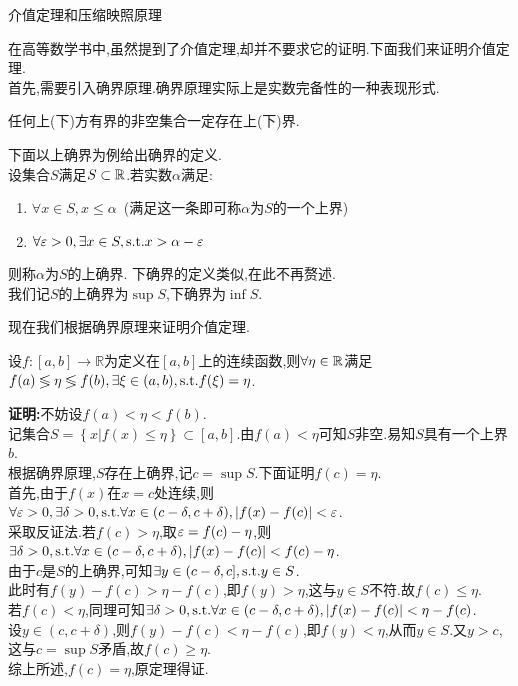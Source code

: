 \documentclass{ctexart}
\begin{document}
\pagestyle{empty}
\begin{center}\large 介值定理和压缩映照原理\end{center}
在高等数学书中,虽然提到了介值定理,却并不要求它的证明.下面我们来证明介值定理.\\
首先,需要引入确界原理.确界原理实际上是实数完备性的一种表现形式.
\begin{formal}[确界原理]
    任何上(下)方有界的非空集合一定存在上(下)界.
\end{formal}
\begin{theorem}
    下面以上确界为例给出确界的定义.\\
    设集合$S$满足$S\subset \mathbb{R}$.若实数$\alpha$满足:
    \begin{enumerate}[label=(\alph*)]
        \item $\forall x\in S,x\leqslant\alpha$\ (满足这一条即可称$\alpha$为$S$的一个上界)
        \item $\forall\varepsilon>0,\exists x\in S,\text{s.t.} x>\alpha-\varepsilon$
    \end{enumerate}
    则称$\alpha$为$S$的上确界.
    下确界的定义类似,在此不再赘述.\\
    我们记$S$的上确界为$\sup{S}$,下确界为$\inf{S}$.
\end{theorem}\noindent
现在我们根据确界原理来证明介值定理.
\begin{formal}[介值定理]
    设$f:[a,b]\to\mathbb{R}$为定义在$[a,b]$上的连续函数,则$\forall\eta\in\mathbb{R}$满足$f(a)\lessgtr\eta\lessgtr f(b),\exists\xi\in(a,b),\text{s.t.} f(\xi)=\eta$.
\end{formal}
\begin{solution}
    \textbf{证明:}不妨设$f(a)<\eta<f(b)$.\\
    记集合$S=\left\{x|f(x)\leqslant \eta\right\}\subset[a,b].$由$f(a)<\eta$可知$S$非空.易知$S$具有一个上界$b$.\\
    根据确界原理,$S$存在上确界,记$c=\sup{S}$.下面证明$f(c)=\eta$.\\
    首先,由于$f(x)$在$x=c$处连续,则$\forall\varepsilon>0,\exists\delta>0,\text{s.t.}\forall x\in(c-\delta,c+\delta),\left\lvert f(x)-f(c)\right\rvert<\varepsilon$.\\
    采取反证法.若$f(c)>\eta$,取$\varepsilon=f(c)-\eta$,则$\exists\delta>0,\text{s.t.}\forall x\in(c-\delta,c+\delta),\left\lvert f(x)-f(c)\right\rvert<f(c)-\eta$.\\
    由于$c$是$S$的上确界,可知$\exists y\in(c-\delta,c],\text{s.t.} y\in S$.\\
    此时有$f(y)-f(c)>\eta-f(c)$,即$f(y)>\eta$,这与$y\in S$不符.故$f(c)\leqslant\eta$.\\
    若$f(c)<\eta$,同理可知$\exists\delta>0,\text{s.t.}\forall x\in(c-\delta,c+\delta),\left\lvert f(x)-f(c)\right\rvert<\eta-f(c)$.\\
    设$y\in(c,c+\delta)$,则$f(y)-f(c)<\eta-f(c)$,即$f(y)<\eta$,从而$y\in S$.又$y>c$,这与$c=\sup{S}$矛盾,故$f(c)\geqslant\eta$.\\
    综上所述,$f(c)=\eta$,原定理得证.
\end{solution}\noindent
\end{document}
